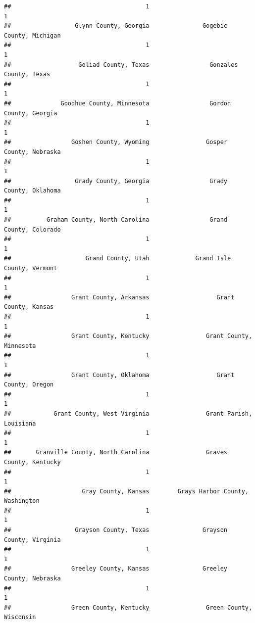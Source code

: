 \documentclass[
]{article}
\begin{document}
\begin{verbatim}
##                                      1                                      1 
##                  Glynn County, Georgia               Gogebic County, Michigan 
##                                      1                                      1 
##                   Goliad County, Texas                 Gonzales County, Texas 
##                                      1                                      1 
##              Goodhue County, Minnesota                 Gordon County, Georgia 
##                                      1                                      1 
##                 Goshen County, Wyoming                Gosper County, Nebraska 
##                                      1                                      1 
##                  Grady County, Georgia                 Grady County, Oklahoma 
##                                      1                                      1 
##          Graham County, North Carolina                 Grand County, Colorado 
##                                      1                                      1 
##                     Grand County, Utah             Grand Isle County, Vermont 
##                                      1                                      1 
##                 Grant County, Arkansas                   Grant County, Kansas 
##                                      1                                      1 
##                 Grant County, Kentucky                Grant County, Minnesota 
##                                      1                                      1 
##                 Grant County, Oklahoma                   Grant County, Oregon 
##                                      1                                      1 
##            Grant County, West Virginia                Grant Parish, Louisiana 
##                                      1                                      1 
##       Granville County, North Carolina                Graves County, Kentucky 
##                                      1                                      1 
##                    Gray County, Kansas        Grays Harbor County, Washington 
##                                      1                                      1 
##                  Grayson County, Texas               Grayson County, Virginia 
##                                      1                                      1 
##                 Greeley County, Kansas               Greeley County, Nebraska 
##                                      1                                      1 
##                 Green County, Kentucky                Green County, Wisconsin 

\end{verbatim}
\end{document}
